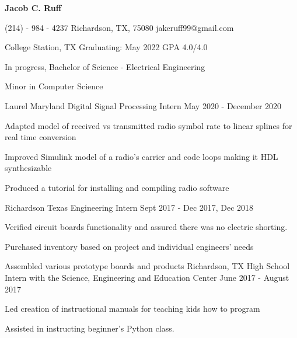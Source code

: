 \documentclass[11pt]{article} %
\begin{document}
\centerline{{\Huge \bf Jacob C. Ruff}}

\bigskip

	{(214) - 984 - 4237}
        {Richardson, TX, 75080}
        {jakeruff99@gmail.com}


\begin{description}
\squish
{}
           {College Station, TX}
           {Graduating: May 2022}
	   {GPA 4.0/4.0}


In progress, Bachelor of Science - Electrical Engineering

Minor in Computer Science

\end{description}



\begin{description}
\squish

	   {Laurel Maryland}
           {Digital Signal Processing Intern}
           {May 2020 - December 2020}

	   Adapted model of received  vs transmitted radio symbol rate to linear splines for real time conversion

	   Improved Simulink model of a radio's carrier and code loops making it HDL synthesizable

	   Produced a tutorial for installing and compiling radio software

	   {Richardson Texas}
           {Engineering Intern}
           {Sept 2017 - Dec 2017, Dec 2018}

	Verified circuit boards functionality and assured there was no electric shorting.

	Purchased inventory based on project and individual engineers' needs

	Assembled various prototype boards and products
		{Richardson, TX}
		{High School Intern with the Science, Engineering and Education Center}
		{June 2017 - August 2017}

		Led creation of instructional manuals for teaching kids how to program

		Assisted in instructing beginner's Python class.

\end{description}
\end{document}
